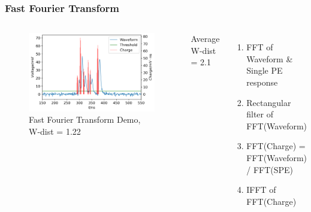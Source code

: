 \documentclass{beamer}
\begin{document}
\begin{frame}
\frametitle{Fast Fourier Transform}
\begin{columns}
\begin{figure}
    \centering
    \caption{Fast Fourier Transform Demo, W-dist = 1.22}
    \includegraphics[width=1.0\linewidth]{img/fftrans.png}
\end{figure}
\vspace{-4mm}
\begin{center}
    Average W-dist = 2.1
\end{center}
\begin{enumerate}
    \item FFT of Waveform \& Single PE response
    \item Rectangular filter of FFT(Waveform)
    \item FFT(Charge) = FFT(Waveform) / FFT(SPE)
    \item IFFT of FFT(Charge)
\end{enumerate}
\end{columns}
\end{frame}
\end{document}
